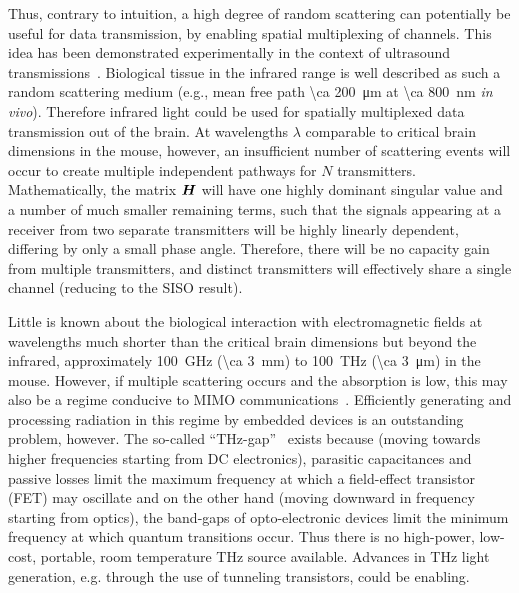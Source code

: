 Thus, contrary to intuition, a high degree of random scattering can potentially be useful for data transmission, by enabling spatial multiplexing of channels.
This idea has been demonstrated experimentally in the context of ultrasound transmissions~\cite{derode03}.
Biological tissue in the infrared range is well described as such a random scattering medium (e.g., mean free path \SI{\ca 200}{\micro\meter} at \SI{\ca 800}{\nano\meter} \emph{in vivo}).
Therefore infrared light could be used for spatially multiplexed data transmission out of the brain.
At wavelengths $\lambda$ comparable to critical brain dimensions in the mouse, however, an insufficient number of scattering events will occur to create multiple independent pathways for $N$ transmitters.
Mathematically, the matrix $\mat{H}$ will have one highly dominant singular value and a number of much smaller remaining terms, such that the signals appearing at a receiver from two separate transmitters will be highly linearly dependent, differing by only a small phase angle.
Therefore, there will be no capacity gain from multiple transmitters, and distinct transmitters will effectively share a single channel (reducing to the SISO result).

Little is known about the biological interaction with electromagnetic fields at wavelengths much shorter than the critical brain dimensions but beyond the infrared, approximately \SI{100}{\giga\hertz} (\SI{\ca 3}{\milli\meter}) to \SI{100}{\tera\hertz} (\SI{\ca 3}{\micro\meter}) in the mouse.
However, if multiple scattering occurs and the absorption is low, this may also be a regime conducive to MIMO communications~\cite{bakopoulos09,helmchen05}.
Efficiently generating and processing radiation in this regime by embedded devices is an outstanding problem, however.
The so-called ``THz-gap''~\cite{tonouchi07} exists because (moving towards higher frequencies starting from DC electronics), parasitic capacitances and passive losses limit the maximum frequency at which a field-effect transistor (FET) may oscillate and on the other hand (moving downward in frequency starting from optics), the band-gaps of opto-electronic devices limit the minimum frequency at which quantum transitions occur.
Thus there is no high-power, low-cost, portable, room temperature \si{THz} source available.
Advances in \si{THz} light generation, e.g. through the use of tunneling transistors, could be enabling.

